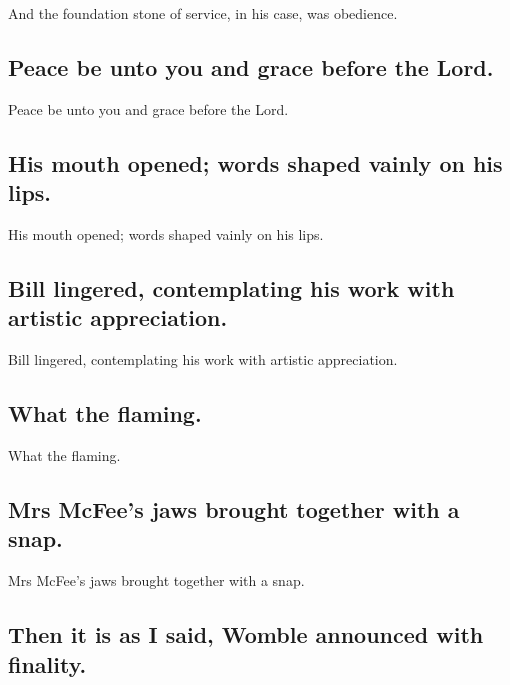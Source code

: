 \documentclass[]{article}
\begin{document}
And the foundation stone of service, in his case, was obedience.

\hypertarget{peace-be-unto-you-and-grace-before-the-lord.}{%
\subsection{Peace be unto you and grace before the
Lord.}\label{peace-be-unto-you-and-grace-before-the-lord.}}

Peace be unto you and grace before the Lord.

\hypertarget{his-mouth-opened-words-shaped-vainly-on-his-lips.}{%
\subsection{His mouth opened; words shaped vainly on his
lips.}\label{his-mouth-opened-words-shaped-vainly-on-his-lips.}}

His mouth opened; words shaped vainly on his lips.

\hypertarget{bill-lingered-contemplating-his-work-with-artistic-appreciation.}{%
\subsection{Bill lingered, contemplating his work with artistic
appreciation.}\label{bill-lingered-contemplating-his-work-with-artistic-appreciation.}}

Bill lingered, contemplating his work with artistic appreciation.

\hypertarget{what-the-flaming.}{%
\subsection{What the flaming.}\label{what-the-flaming.}}

What the flaming.

\hypertarget{mrs-mcfees-jaws-brought-together-with-a-snap.}{%
\subsection{Mrs McFee's jaws brought together with a
snap.}\label{mrs-mcfees-jaws-brought-together-with-a-snap.}}

Mrs McFee's jaws brought together with a snap.

\hypertarget{then-it-is-as-i-said-womble-announced-with-finality.}{%
\subsection{Then it is as I said, Womble announced with
finality.}\label{then-it-is-as-i-said-womble-announced-with-finality.}}
\end{document}
